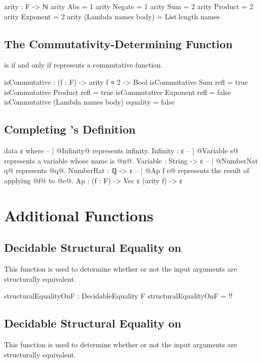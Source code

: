 \documentclass{report}
\begin{document}
\begin{code}
arity : F -> ℕ
arity Abs = 1
arity Negate = 1
arity Sum = 2
arity Product = 2
arity Exponent = 2
arity (Lambda names body) = List.length names
\end{code}

\subsection{The Commutativity-Determining Function}
   is  if and only if  represents a commutative function.

\begin{code}
isCommutative : (f : F) -> arity f ≡ 2 -> Bool
isCommutative Sum refl = true
isCommutative Product refl = true
isCommutative Exponent refl = false
isCommutative (Lambda names body) equality = false
\end{code}

\subsection{Completing 's Definition}

\begin{code}
data ε where
  -- | @Infinity@ represents infinity.
  Infinity : ε
  -- | @Variable s@ represents a variable whose name is @n@.
  Variable : String -> ε
  -- | @NumberNat q@ represents @q@.
  NumberRat : ℚ -> ε
  -- | @Ap f e@ represents the result of applying @f@ to @e@.
  Ap : (f : F) -> Vec ε (arity f) -> ε
\end{code}

\section{Additional Functions}

\subsection{Decidable Structural Equality on }
This function is used to determine whether or not the input arguments are structurally equivalent.

\begin{code}
structuralEqualityOnF : DecidableEquality F
structuralEqualityOnF = {!!}
\end{code}

\subsection{Decidable Structural Equality on }
This function is used to determine whether or not the input arguments are structurally equivalent.
\end{document}
